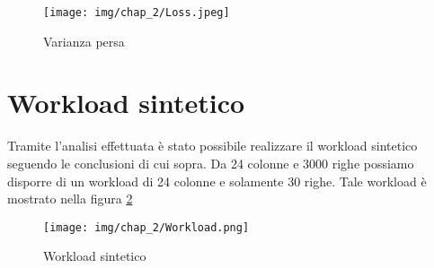 \begin{figure}[H]
    \centering
    \texttt{[image: img/chap\_2/Loss.jpeg]}
    \caption{Varianza persa}
    \label{fig:varianzaPersa}
\end{figure}
\section{Workload sintetico}
Tramite l'analisi effettuata è stato possibile realizzare il workload sintetico seguendo le conclusioni di cui sopra. Da 24 colonne e 3000 righe possiamo disporre di un workload di 24 colonne e solamente 30 righe.
Tale workload è mostrato nella figura \ref{fig:workload}
\begin{figure}[H]
    \centering
    \texttt{[image: img/chap\_2/Workload.png]}
    \caption{Workload sintetico}
    \label{fig:workload}
\end{figure}